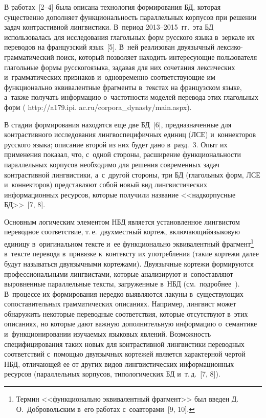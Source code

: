 \begin{multicols}{2}
  В работах~[2--4] была описана технология формирования БД, 
которая существенно дополняет функциональность параллельных кор\-пу\-сов 
при решении задач контрастивной лингвистики. В~период 2013--2015~гг.\ 
эта БД использовалась для исследования глагольных форм русского 
языка в~зеркале их переводов на французский язык~[5]. В~ней реализован 
двуязычный лек\-си\-ко-грам\-ма\-ти\-ческий поиск, который позволяет 
находить интересующие пользователя глагольные формы русского\linebreak языка, 
задавая для них сочетания лексических и~грамматических признаков 
и~одновременно соответствующие им функционально эквивалентные 
фрагменты в~текстах на французском языке, а~так\-же получать информацию 
о~час\-тот\-ности моделей перевода этих глагольных форм ({\sf 
http://a179.ipi. ac.ru/corpora\_dynasty/main.aspx}).
  
  В стадии формирования находятся еще две БД~[6], 
предназначенные для контрастивного исследования лингвоспецифичных 
единиц (ЛСЕ) и~коннекторов русского языка; описание второй из них будет 
дано в~разд.~3. Опыт их применения показал, что, с~одной стороны, 
расширение функциональности параллельных корпусов необходимо для 
решения современных задач контрастивной лингвистики, а~с~другой стороны, 
три БД (глагольных форм, ЛСЕ и~коннекторов) пред\-став\-ля\-ют собой 
новый вид лингвистических информационных ресурсов, которые получили 
название <<надкорпусные БД>>~[7, 8].
  
  Основным логическим элементом НБД является установленное 
лингвистом переводное соответствие, т.\,е.\ двухместный кортеж, 
вклю\-ча\-ющий\linebreak языковую единицу в~оригинальном тексте и~ее функционально 
эквивалентный фрагмент\footnote{Термин <<функционально эквивалентный фрагмент>> 
был введен Д.\,О.~Добровольским в~его работах с~соавторами~[9, 10].} в~тексте перевода 
в~привязке к~контексту их употребления (такие кортежи далее будут 
называться двуязычными кортежами). Двуязычные кортежи формируются 
профессиональными лингвистами, которые анализируют и~сопоставляют 
выровненные параллельные тексты, загруженные в~НБД (см.\ 
подробнее~\cite{3-zat}). В~процессе их формирования нередко выявляются 
лакуны в~существующих сопоставительных грамматических описаниях. 
Например, лингвист может обнаружить некоторые переводные соответствия, 
которые отсутствуют в~этих описаниях, но которые дают важную 
дополнительную информацию о~семантике и~функционировании изучаемых 
языковых явлений. Возможность специфицирования таких новых для 
контрастивной лингвистики переводных соответствий с~по\-мощью 
двуязычных кортежей является характерной чертой НБД, отличающей ее от 
других видов лингвистических информационных ресурсов (параллельных 
корпусов, типологических БД и~т.\,д.~[7, 8]).
  

\end{multicols}
